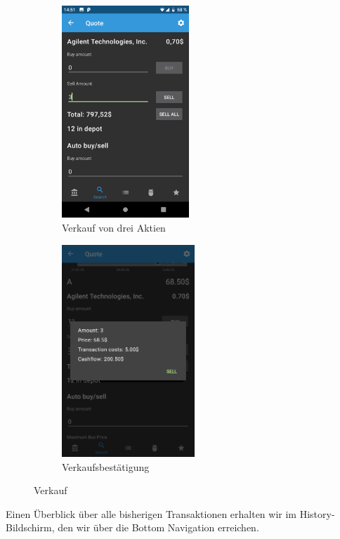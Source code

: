 \documentclass[a4paper]{article}
\begin{document}
\begin{figure}[H]
	\begin{subfigure}{.5\textwidth}
		\centering
		\includegraphics[height=8cm,keepaspectratio]{./images/demo/sell.png}
		\caption{Verkauf von drei Aktien}
		\label{fig:demo:sell_a_three}
	\end{subfigure}
	\begin{subfigure}{.5\textwidth}
		\centering
		\includegraphics[height=8cm,keepaspectratio]{./images/demo/sell_a_confirmation.png}
		\caption{Verkaufsbestätigung}
		\label{fig:demo:sell_a_confirmation}
	\end{subfigure}
	\caption{Verkauf}
	\label{fig:demo:sell_a}
\end{figure}

Einen Überblick über alle bisherigen Transaktionen erhalten wir im History-Bildschirm, den wir über die Bottom Navigation erreichen. 
\end{document}
